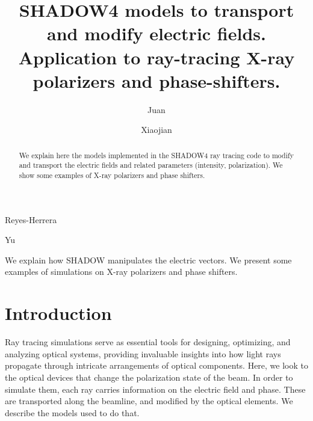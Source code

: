\documentclass{iucr}
\begin{document}

\title{SHADOW4 models to transport and modify electric fields.
Application to ray-tracing X-ray polarizers and phase-shifters.}

\author[1]{{Juan}}{{Reyes-Herrera}}
\author[2]{{Xiaojian}}{{Yu}}


\maketitle   %


\begin{synopsis}
We explain how SHADOW manipulates the electric vectors. We present some examples of simulations on X-ray polarizers and phase shifters. 
\end{synopsis}


\begin{abstract}
We explain here the models implemented in the SHADOW4 ray tracing code to modify and transport the electric fields and related parameters (intensity, polarization). We show some examples of X-ray polarizers and phase shifters.
\end{abstract}

\section{Introduction}\label{sec:introduction}

Ray tracing simulations serve as essential tools for designing, optimizing, and analyzing optical systems, providing invaluable insights into how light rays propagate through intricate arrangements of optical components. Here, we look to the optical devices that change the polarization state of the beam. In order to simulate them, each ray carries information on the electric field and phase. These are transported along the beamline, and modified by the optical elements. We describe the models used to do that. 
\end{document}
